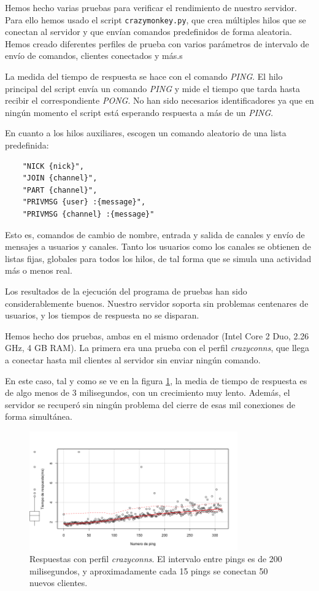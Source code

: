 \documentclass{article}
\begin{document}
Hemos hecho varias pruebas para verificar el rendimiento de nuestro servidor. Para ello hemos usado el script \texttt{crazymonkey.py}, que crea múltiples hilos que se conectan al servidor y que envían comandos predefinidos de forma aleatoria. Hemos creado diferentes perfiles de prueba con varios parámetros de intervalo de envío de comandos, clientes conectados y más.s

La medida del tiempo de respuesta se hace con el comando \textit{PING}. El hilo principal del script envía un comando \textit{PING} y mide el tiempo que tarda hasta recibir el correspondiente \textit{PONG}. No han sido necesarios identificadores ya que en ningún momento el script está esperando respuesta a más de un \textit{PING}.

En cuanto a los hilos auxiliares, escogen un comando aleatorio de una lista predefinida:

\begin{verbatim}
	"NICK {nick}",
	"JOIN {channel}",
	"PART {channel}",
	"PRIVMSG {user} :{message}",
	"PRIVMSG {channel} :{message}"
\end{verbatim}

Esto es, comandos de cambio de nombre, entrada y salida de canales y envío de mensajes a usuarios y canales. Tanto los usuarios como los canales se obtienen de listas fijas, globales para todos los hilos, de tal forma que se simula una actividad más o menos real.

Los resultados de la ejecución del programa de pruebas han sido considerablemente buenos. Nuestro servidor soporta sin problemas centenares de usuarios, y los tiempos de respuesta no se disparan. 

Hemos hecho dos pruebas, ambas en el mismo ordenador (Intel Core 2 Duo, 2.26 GHz, 4 GB RAM). La primera era una prueba con el perfil \textit{crazyconns}, que llega a conectar hasta mil clientes al servidor sin enviar ningún comando. 

En este caso, tal y como se ve en la figura \ref{imgCrazyconns}, la media de tiempo de respuesta es de algo menos de 3 milisegundos, con un crecimiento muy lento. Además, el servidor se recuperó sin ningún problema del cierre de esas mil conexiones de forma simultánea.

\begin{figure}[hbtp]
\centering
\includegraphics[width=0.8\textwidth]{scatter.png}
\caption{Respuestas con perfil \textit{crazyconns}. El intervalo entre pings es de 200 milisegundos, y aproximadamente cada 15 pings se conectan 50 nuevos clientes.}
\label{imgCrazyconns}
\end{figure}
\end{document}
